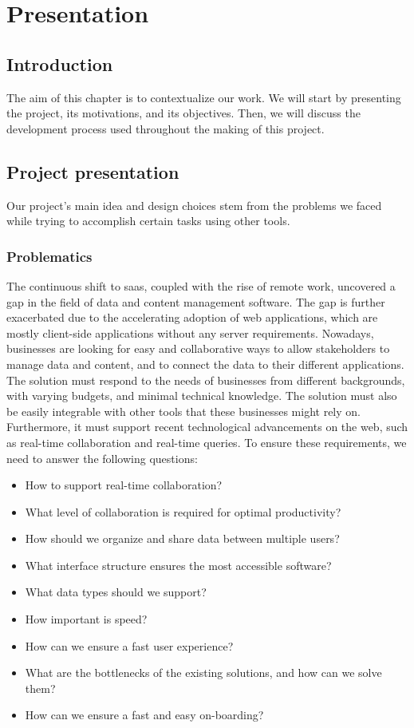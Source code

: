 \chapter{Presentation}
\label{chap:intro}

\section{Introduction}

The aim of this chapter is to contextualize our work.
We will start by presenting the project, its motivations, and its objectives.
Then, we will discuss the development process used throughout the making of this project.

\section{Project presentation}

Our project's main idea and design choices stem from the problems we faced while trying to accomplish certain tasks using other tools.

\subsection{Problematics}

The continuous shift to \acrfull{saas}, coupled with the rise of remote work, uncovered a gap in the field of data and content management software.
The gap is further exacerbated due to the accelerating adoption of web applications, which are mostly client-side applications without any server requirements.
Nowadays, businesses are looking for easy and collaborative ways to allow stakeholders to manage data and content, and to connect the data to their different applications.
The solution must respond to the needs of businesses from different backgrounds, with varying budgets, and minimal technical knowledge.
The solution must also be easily integrable with other tools that these businesses might rely on.
Furthermore, it must support recent technological advancements on the web, such as real-time collaboration and real-time queries.
To ensure these requirements, we need to answer the following questions:

\begin{itemize}
	\item How to support real-time collaboration?
	\item What level of collaboration is required for optimal productivity?
	\item How should we organize and share data between multiple users?
	\item What interface structure ensures the most accessible software?
	\item What data types should we support?
	\item How important is speed?
	\item How can we ensure a fast user experience?
	\item What are the bottlenecks of the existing solutions, and how can we solve them?
	\item How can we ensure a fast and easy on-boarding?
\end{itemize}

